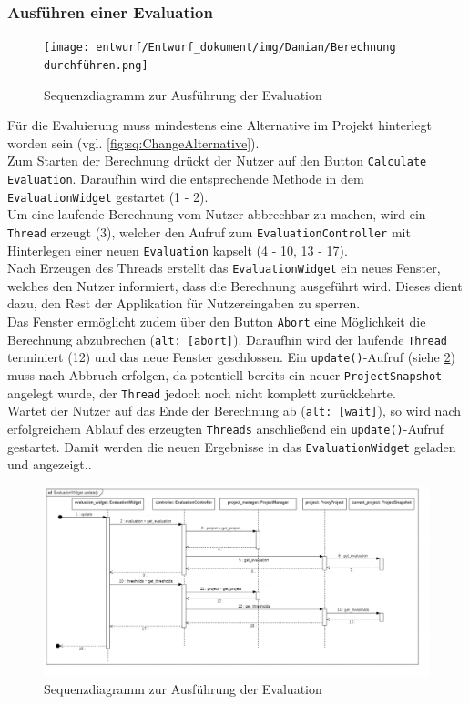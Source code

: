 \documentclass{article}
\begin{document}
\subsubsection{Ausführen einer Evaluation}
\begin{figure}[H]%
    \centering
    \texttt{[image: entwurf/Entwurf\_dokument/img/Damian/Berechnung durchführen.png]}
    \caption{Sequenzdiagramm zur Ausführung der Evaluation}
    \label{fig:sq:CalculateEvaluation}
\end{figure}

Für die Evaluierung muss mindestens eine Alternative im Projekt hinterlegt worden sein (vgl. \ref{fig:sq:ChangeAlternative}). \\
Zum Starten der Berechnung drückt der Nutzer auf den Button \texttt{Calculate Evaluation}. Daraufhin wird die entsprechende Methode in dem \texttt{EvaluationWidget} gestartet (1 - 2). \\
Um eine laufende Berechnung vom Nutzer abbrechbar zu machen, wird ein \texttt{Thread} erzeugt (3), welcher den Aufruf zum \texttt{EvaluationController} mit Hinterlegen einer neuen \texttt{Evaluation} kapselt (4 - 10, 13 - 17). \\
Nach Erzeugen des Threads erstellt das \texttt{EvaluationWidget} ein neues Fenster, welches den Nutzer informiert, dass die Berechnung ausgeführt wird. Dieses dient dazu, den Rest der Applikation für Nutzereingaben zu sperren. \\
Das Fenster ermöglicht zudem über den Button \texttt{Abort} eine Möglichkeit die Berechnung abzubrechen (\texttt{alt: [abort]}). Daraufhin wird der laufende \texttt{Thread} terminiert (12) und das neue Fenster geschlossen. Ein \texttt{update()}-Aufruf (siehe \ref{fig:sq:UpdateEvaluationWidget}) muss nach Abbruch erfolgen, da potentiell bereits ein neuer \texttt{ProjectSnapshot} angelegt wurde, der \texttt{Thread} jedoch noch nicht komplett zurückkehrte. \\
Wartet der Nutzer auf das Ende der Berechnung ab (\texttt{alt: [wait]}), so wird nach erfolgreichem Ablauf des erzeugten \texttt{Threads} anschließend ein \texttt{update()}-Aufruf gestartet. Damit werden die neuen Ergebnisse in das \texttt{EvaluationWidget} geladen und angezeigt..


\begin{figure}[H]%
    \centering
    \includegraphics[width=13cm]{entwurf/Entwurf_dokument/img/Damian/EvaluationWidget.update().png}
    \caption{Sequenzdiagramm zur Ausführung der Evaluation}
    \label{fig:sq:UpdateEvaluationWidget}
\end{figure}
\end{document}
